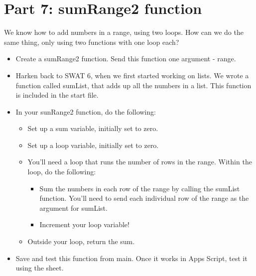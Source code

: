 \documentclass{article}
\begin{document}
\section*{Part 7: sumRange2 function}
We know how to add numbers in a range, using two loops.  How can we do the same thing, only using two functions with one loop each?
\begin{itemize}
    \item Create a sumRange2 function.  Send this function one argument - range.
    \item Harken back to SWAT 6, when we first started working on lists.  We wrote a function called sumList, that adds up all the numbers in a list.  This function is included in the start file.
    \item In your sunRange2 function, do the following:
    \begin{itemize}
    		\item Set up a sum variable, initially set to zero.
    		\item Set up a loop variable, initially set to zero.
    		\item You'll need a loop that runs the number of rows in the range.  Within the loop, do the following:
    		\begin{itemize}
    			\item Sum the numbers in each row of the range by calling the sumList function.  You'll need to send each individual row of the range as the argument for sumList.
    			\item Increment your loop variable!
    		\end{itemize}
    		\item Outside your loop, return the sum.
    	\end{itemize}
    	\item Save and test this function from main.  Once it works in Apps Script, test it using the sheet.
\end{itemize}
\end{document}
